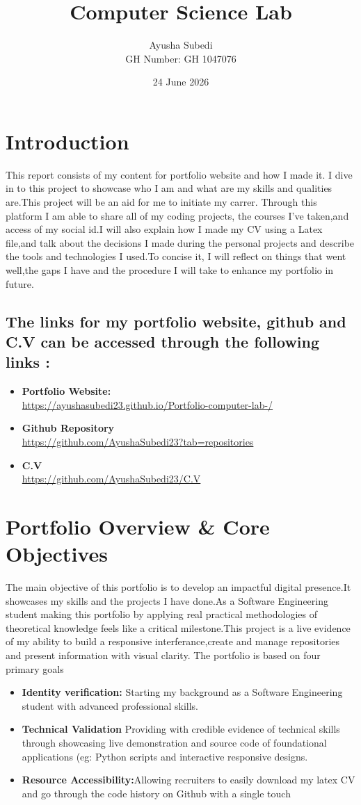 \documentclass {article}
\title{Computer Science Lab}
\author{Ayusha Subedi \\ GH Number: GH 1047076}
\date{24 June 2026}
\begin{document}
\maketitle
\newpage

\section{Introduction}
This report consists of my content for portfolio website and how I made it. I dive in to this project to showcase who I am and what are my skills and qualities are.This project will be an aid for me to initiate my carrer. Through this platform I am able to share all of my coding projects, the courses I've taken,and access of my social id.I will also explain how I made my CV using a Latex file,and talk about the decisions I made during the personal projects and describe the tools and technologies I used.To concise it, I will reflect on things that went well,the gaps I have and the procedure I will take to enhance my portfolio in future.
\subsection{
The links for my portfolio website, github and C.V can be accessed through the following links :}
\begin{itemize}
    \item \textbf{Portfolio Website:} \\  \url{https://ayushasubedi23.github.io/Portfolio-computer-lab-/ }
    \item \textbf{Github Repository} \\ \url{https://github.com/AyushaSubedi23?tab=repositories}
    \item \textbf{C.V} \\ \url{https://github.com/AyushaSubedi23/C.V}
\end{itemize}
\section{ Portfolio Overview \& Core Objectives }
The main objective of this portfolio is to develop an impactful digital presence.It showcases my skills and the projects I have done.As a Software Engineering student making this portfolio by applying real practical methodologies of theoretical knowledge feels like a critical milestone.This project is a live evidence of my ability to build a responsive interferance,create and manage repositories and present information with visual clarity.
The portfolio is based on four primary goals 
\begin{itemize}
    \item \textbf{Identity verification:} Starting my background as a Software Engineering student with advanced professional skills.
\item \textbf{Technical Validation} Providing with credible evidence of technical skills through showcasing live demonstration and source code of foundational applications (eg: Python scripts and interactive responsive designs.
\item \textbf{Resource Accessibility:}Allowing recruiters to easily download my latex CV and go through the code history on Github with a single touch 
\end{itemize}
\newpage
\end{document}
